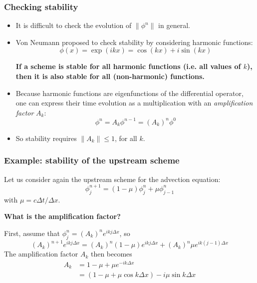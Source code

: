 \documentclass[aspectratio=43,9pt]{beamer}
\begin{document}
\begin{frame}
	\frametitle{Checking stability}
	\begin{itemize}
		\item It is difficult to check the evolution of $\| \phi^n \|$ in general.\vspace*{2ex}
		\item Von Neumann proposed to check stability by considering harmonic functions:
			\begin{equation*}
				\phi(x)=\exp(ik x)=\cos(kx)+i\sin(kx)
			\end{equation*}
			\begin{center}
				\bfseries
				If a scheme is stable for all harmonic functions (i.e. all values of $k$),\\ then it is also stable for all (non-harmonic) functions.
			\end{center}\vspace*{2ex}
		\item Because harmonic functions are eigenfunctions of the differential operator, one can express their time evolution as a multiplication with an \emph{amplification factor} $A_k$:
			\begin{equation*}
				\phi^{n}=A_k\phi^{n-1}=\left(A_k\right)^n\phi^0
			\end{equation*}\par\vspace*{2ex}
		\item So stability requires $\|A_k\|\leq 1$, for all $k$.
	\end{itemize}
\end{frame}
%
%
\begin{frame}
	\frametitle{Example: stability of the upstream scheme}
	Let us consider again the upstream scheme for the advection equation:
	\begin{equation*}
		\phi_j^{n+1} = (1-\mu) \phi_j^n + \mu \phi_{j-1}^n
	\end{equation*}
	with $\mu = c \Delta t / \Delta x$.
	\par\vspace*{6ex}
	\textbf{What is the amplification factor?}
\pause
	\par\vspace*{4ex}
	First, assume that $\phi_j^n=(A_k)^ne^{ikj\Delta x}$, so\vspace*{2ex}
	\begin{equation*}
		(A_k)^{n+1} e^{ik j \Delta x} = (A_k)^{n}(1-\mu )e^{ikj \Delta x}
		+ (A_k)^{n}\mu e^{ik(j-1) \Delta x}
	\end{equation*}
\pause
	The amplification factor $A_k$ then becomes
	\begin{align*}
		A_k &= 1 -\mu +\mu e^{-ik \Delta x}	\\
			&=(1-\mu+\mu\cos k\Delta x) - i \mu\sin k\Delta x
	\end{align*}
\end{frame}
\end{document}
